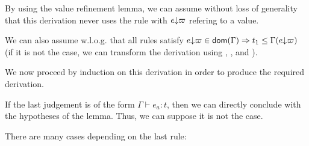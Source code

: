 \documentclass[a4paper]{article}
\theoremstyle{definition}
\begin{document}
        By using the value refinement lemma, we can assume without loss of generality that this derivation
        never uses the rule  with $e{\downarrow}\varpi$ refering to a value.

        We can also assume w.l.o.g. that all rules  satisfy
        $e{\downarrow}\varpi \in\textsf{dom}(\Gamma) \Rightarrow t_1 \leq \Gamma(e{\downarrow}\varpi)$ (if it is not the case,
        we can transform the derivation using , ,  and ).

        We now proceed by induction on this derivation in order to produce the required derivation.
        
        If the last judgement is of the form $\Gamma \vdash e_a: t$, then we can directly conclude with the hypotheses of the lemma.
        Thus, we can suppose it is not the case.

        There are many cases depending on the last rule:
\end{document}
